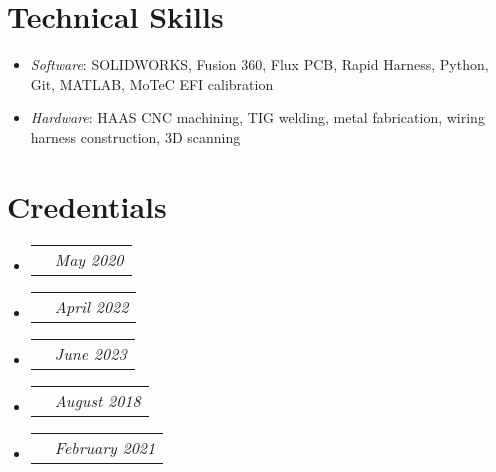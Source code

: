 \documentclass[letterpaper,11pt]{article}
\makeatletter
\newcommand{\role}[2]{
  \vspace{-5pt}\item
    \begin{tabular*}{1.0\textwidth}[t]{l@{\extracolsep{\fill}}r}
      \textit{\small#1} & \textit{\small #2} \\
    \end{tabular*}\vspace{-7pt}
}
\newcommand{\resumeItem}[1]{
  \item\small{
    {#1 \vspace{-2pt}}
  }
}
\newcommand{\credential}[2]{
  \item
    \begin{tabular*}{0.94\textwidth}[t]{l@{\extracolsep{\fill}}r}
      \text{\small#1} & \textit{\small #2} \\
    \end{tabular*}\vspace{-7pt}
}
\newcommand{\resumeItemListStart}{\begin{itemize}}
\newcommand{\resumeItemListEnd}{\end{itemize}\vspace{-5pt}}
\newcommand{\credentialListStart}{\begin{itemize}}
\newcommand{\credentialListEnd}{\end{itemize}\vspace{-5pt}}
\makeatother
\begin{document}
            
\section{Technical Skills}
    \resumeItemListStart
        \resumeItem{\textit{Software}{: SOLIDWORKS, Fusion 360, Flux PCB, Rapid Harness, Python, Git, MATLAB, MoTeC EFI calibration}} \vspace{-5pt}
        \resumeItem{\textit{Hardware}{: HAAS CNC machining, TIG welding, metal fabrication, wiring harness construction, 3D scanning}}
    \resumeItemListEnd
 \vspace{-16pt}

\section{Credentials}
    \credentialListStart
        \credential{Certified SOLIDWORKS Associate (CSWA) - Mechanical Design}{May 2020}
        \credential{Certified SOLIDWORKS Associate (CSWA) - Simulation}{April 2022}
        \credential{SCCA (Sports Car Club of America) Regional Scrutineer License}{June 2023}
        \credential{Eagle Scout - Boy Scouts of America}{August 2018}
        \credential{Level 1 Alpine Certification - Professional Ski Instructors of America (PSIA) }{February 2021}
    \credentialListEnd
    
\end{document}

